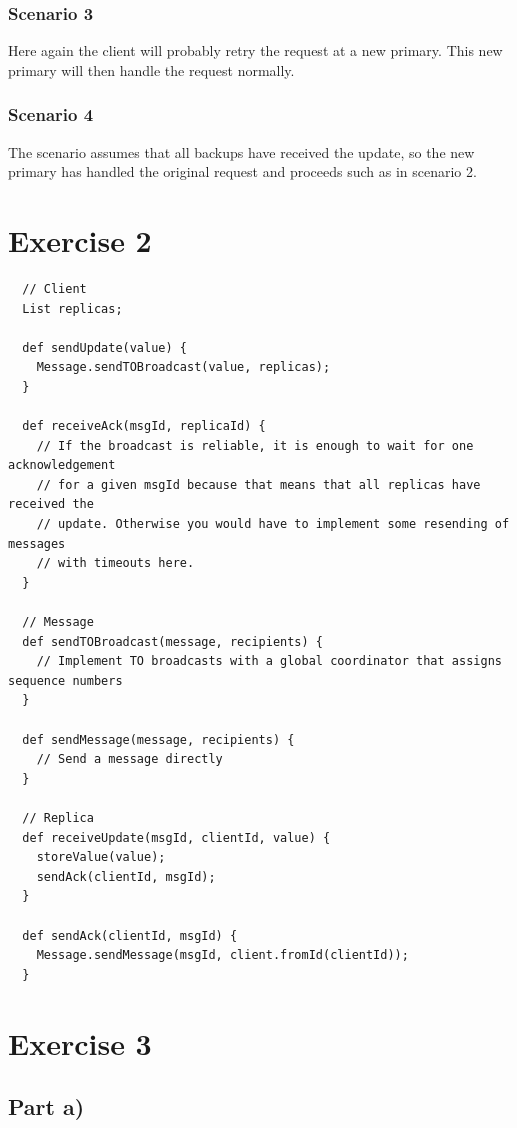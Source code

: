 \documentclass[10pt,a4paper]{article}
\begin{document}
\subsubsection*{Scenario 3}

Here again the client will probably retry the request at a new primary.
This new primary will then handle the request normally.

\subsubsection*{Scenario 4}

The scenario assumes that all backups have received the update, so the new primary has handled the original request and proceeds such as in scenario 2.

\section*{Exercise 2}

\begin{verbatim}
  // Client
  List replicas;

  def sendUpdate(value) {
    Message.sendTOBroadcast(value, replicas);
  }

  def receiveAck(msgId, replicaId) {
    // If the broadcast is reliable, it is enough to wait for one acknowledgement
    // for a given msgId because that means that all replicas have received the
    // update. Otherwise you would have to implement some resending of messages
    // with timeouts here.
  }

  // Message
  def sendTOBroadcast(message, recipients) {
    // Implement TO broadcasts with a global coordinator that assigns sequence numbers
  }

  def sendMessage(message, recipients) {
    // Send a message directly
  }

  // Replica
  def receiveUpdate(msgId, clientId, value) {
    storeValue(value);
    sendAck(clientId, msgId);
  }

  def sendAck(clientId, msgId) {
    Message.sendMessage(msgId, client.fromId(clientId));
  }
\end{verbatim}

\section*{Exercise 3}

\subsection*{Part a)}
\end{document}
